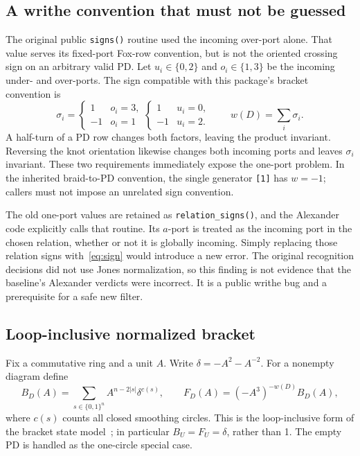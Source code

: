 \documentclass[11pt]{article}
\theoremstyle{definition}\newtheorem{definition}[theorem]{Definition}
\theoremstyle{remark}\newtheorem{remark}[theorem]{Remark}
\begin{document}
\subsection{A writhe convention that must not be guessed}
The original public \texttt{signs()} routine used the incoming over-port alone.
That value serves its fixed-port Fox-row convention, but is not the oriented
crossing sign on an arbitrary valid PD. Let $u_i\in\{0,2\}$ and
$o_i\in\{1,3\}$ be the incoming under- and over-ports. The sign compatible
with this package's bracket convention is
\begin{equation}\label{eq:sign}
 \sigma_i=
 \begin{cases}1&o_i=3,\\-1&o_i=1\end{cases}
 \begin{cases}1&u_i=0,\\-1&u_i=2.\end{cases}
 \qquad w(D)=\sum_i\sigma_i.
\end{equation}
A half-turn of a PD row changes both factors, leaving the product invariant.
Reversing the knot orientation likewise changes both incoming ports and leaves
$\sigma_i$ invariant. These two requirements immediately expose the one-port
problem. In the inherited braid-to-PD convention, the single generator
\texttt{[1]} has $w=-1$; callers must not impose an unrelated sign convention.

The old one-port values are retained as \texttt{relation\_signs()}, and the
Alexander code explicitly calls that routine. Its $a$-port is treated as the
incoming port in the chosen relation, whether or not it is globally incoming.
Simply replacing those relation signs with~\eqref{eq:sign} would introduce a
new error. The original recognition decisions did not use Jones normalization,
so this finding is not evidence that the baseline's Alexander verdicts were
incorrect. It is a public writhe bug and a prerequisite for a safe new filter.

\subsection{Loop-inclusive normalized bracket}
Fix a commutative ring and a unit $A$. Write
$\delta=-A^2-A^{-2}$. For a nonempty diagram define
\begin{equation}\label{eq:bracket}
 B_D(A)=\sum_{s\in\{0,1\}^n}A^{n-2|s|}\delta^{c(s)},
 \qquad F_D(A)=(-A^3)^{-w(D)}B_D(A),
\end{equation}
where $c(s)$ counts all closed smoothing circles. This is the
loop-inclusive form of the bracket state model~\cite{Kauffman}; in particular
$B_U=F_U=\delta$, rather than 1. The empty PD is handled as the one-circle
special case.
\end{document}
